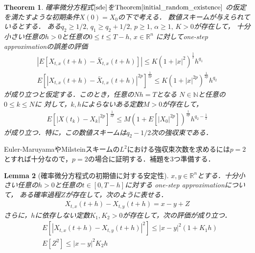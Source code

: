 \documentclass[dvipdfmx,autodetect-engine]{jsarticle}
\newtheorem{theorem}{Theorem}[section]
\newtheorem{lemma}[theorem]{Lemma}
\theoremstyle{remark}
\theoremstyle{definition}
\newcommand{\R}{\mathbb{R}}
\newcommand{\N}{\mathbb{N}}
\newcommand{\abs}[1]{\left\lvert#1\right\rvert}
\begin{document}
\begin{theorem}
    確率微分方程式$\eqref{sde}$を$\mathrm{Theorem}\ref{initial_random_existence}$
    の仮定を満たすような初期条件$X(0)=X_{0}$の下で考える．
    数値スキームが与えられているとする．
    ある$q_{2}\geq 1/2,\, q_{1} \geq q_{2} + 1/2 ,\, 
    p\geq 1,\, \alpha \geq 1,\, K>0$が存在して，
    十分小さい任意の$h>0$と任意の$0\leq t\leq T-h,\, x\in \R^{n}$
    に対してone-step approximationの誤差の評価
    \begin{align}
        \abs{E[X_{t,x}(t+h) - \bar{X}_{t,x}(t+h)]} 
        \leq K(1+\abs{x}^{2})^{\frac{1}{2}} h^{q_{1}} \\
        E[\abs{X_{t,x}(t+h)- \bar{X}_{t,x}(t+h)}^{2p}]^{\frac{1}{2p}}
        \leq K(1+\abs{x}^{2p})^{\frac{1}{2p}} h^{q_{2}}
    \end{align}
    が成り立つと仮定する．このとき，任意の$Nh=T$となる
    $N \in \N$と任意の$0\leq k\leq N$に
    対して，$k,h$によらないある定数$M>0$が存在して，
    \begin{align}
        E[\abs{X(t_{k}) - X_{k}}^{2p}]^{\frac{1}{2p}}
        \leq M(1+E[\abs{X_{0}}^{2p}])^{\frac{1}{2p}} h^{q_{2} - \frac{1}{2}}
    \end{align}
    が成り立つ．特に，この数値スキームは$q_{2}-1/2$次の強収束である．
\end{theorem}


Euler-MaruyamaやMilsteinスキームの$L^2$における強収束次数を求めるには$p=2$
とすれば十分なので，$p=2$の場合に証明する．補題を3つ準備する．


\begin{lemma}[確率微分方程式の初期値に対する安定性]
    $x,y \in \R^{n}$とする．十分小さい任意の$h>0$と任意の$t \in [0,T-h]$に対する
    one-step approximationについて，
    ある確率過程$Z$が存在して，次のように表せる．
    \begin{align}
        X_{t,x}(t+h)-X_{t,y}(t+h) = x - y + Z
    \end{align}
    さらに，$h$に依存しない定数$K_{1},K_{2}>0$が存在して，次の評価が成り立つ．
    \begin{align}
        &E[\abs{X_{t,x}(t+h)-X_{t,y}(t+h)}^{2}] \leq
        \abs{x-y}^{2} (1+K_{1}h) \\
        &E[Z^{2}] \leq \abs{x-y}^{2} K_{2}h
    \end{align}
\end{lemma}
\end{document}
